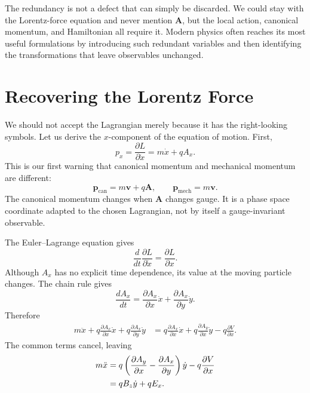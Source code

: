 The redundancy is not a defect that can simply be discarded. We could stay
with the Lorentz-force equation and never mention \(\bm A\), but the local
action, canonical momentum, and Hamiltonian all require it. Modern physics
often reaches its most useful formulations by introducing such redundant
variables and then identifying the transformations that leave observables
unchanged.

\section{Recovering the Lorentz Force}

We should not accept the Lagrangian merely because it has the right-looking
symbols. Let us derive the \(x\)-component of the equation of motion. First,
\begin{equation}
 p_x=\frac{\partial L}{\partial\dot x}
    =m\dot x+qA_x.
 \label{eq:l08-canonical-px}
\end{equation}
This is our first warning that canonical momentum and mechanical momentum
are different:
\begin{equation}
 \bm p_{\mathrm{can}}=m\bm v+q\bm A,
 \qquad
 \bm p_{\mathrm{mech}}=m\bm v.
 \label{eq:l08-two-momenta}
\end{equation}
The canonical momentum changes when \(\bm A\) changes gauge. It is a phase
space coordinate adapted to the chosen Lagrangian, not by itself a
gauge-invariant observable.

The Euler--Lagrange equation gives
\begin{equation}
 \frac{d}{dt}\frac{\partial L}{\partial\dot x}
 =\frac{\partial L}{\partial x}.
\end{equation}
Although \(A_x\) has no explicit time dependence, its value at the moving
particle changes. The chain rule gives
\begin{equation}
 \frac{dA_x}{dt}
 =\frac{\partial A_x}{\partial x}\dot x
 +\frac{\partial A_x}{\partial y}\dot y.
 \label{eq:l08-chain-rule-Ax}
\end{equation}
Therefore
\begin{align}
 m\ddot x
 +q\frac{\partial A_x}{\partial x}\dot x
 +q\frac{\partial A_x}{\partial y}\dot y
 &=q\frac{\partial A_x}{\partial x}\dot x
  +q\frac{\partial A_y}{\partial x}\dot y
  -q\frac{\partial V}{\partial x}.
\end{align}
The common terms cancel, leaving
\begin{align}
 m\ddot x
 &=q\left(
 \frac{\partial A_y}{\partial x}
 -\frac{\partial A_x}{\partial y}
 \right)\dot y-q\frac{\partial V}{\partial x}\notag\\
 &=qB_z\dot y+qE_x.
 \label{eq:l08-recovered-lorentz-x}
\end{align}

